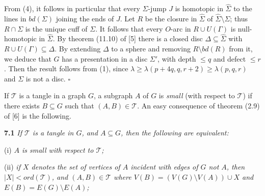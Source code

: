 From (4), it follows in particular that every $\Sigma$-jump $J$ is homotopic in $\hat{\Sigma}$ to the lines in $bd(\Sigma)$ joining the ends of $J$. Let $R$ be the closure in $\hat{\Sigma}$ of $\hat{\Sigma} \setminus \Sigma$; thus $R \cap \Sigma$ is the unique cuff of $\Sigma$. It follows that every $O$-arc in $R \cup U(\Gamma)$ is null-homotopic in $\hat{\Sigma}$. By theorem (11.10) of [5] there is a closed disc $\Delta \subseteq \hat{\Sigma}$ with $R \cup U(\Gamma) \subseteq \Delta$. By extending $\Delta$ to a sphere and removing $R \setminus bd(R)$ from it, we deduce that $G$ has a presentation in a disc $\Sigma'$, with depth $\le q$ and defect $\le r$. Then the result follows from (1), since $\lambda \ge \lambda(p + 4q, q, r + 2) \ge \lambda(p, q, r)$ and $\Sigma$ is not a disc. $\square$


If $\mathcal{T}$ is a tangle in a graph $G$, a subgraph $A$ of $G$ is \textit{small} (with respect to $\mathcal{T}$) if there exists $B \subseteq G$ such that $(A, B) \in \mathcal{T}$. An easy consequence of theorem (2.9) of [6] is the following.

\textbf{7.1} \textit{If $\mathcal{T}$ is a tangle in $G$, and $A \subseteq G$, then the following are equivalent:}

\hspace*{12pt}(i) \textit{$A$ is small with respect to $\mathcal{T}$;}

\hspace*{12pt}(ii) \textit{if $X$ denotes the set of vertices of $A$ incident with edges of $G$ not $A$, then $|X| < ord(\mathcal{T})$, and $(A, B) \in \mathcal{T}$ where $V(B) = (V(G) \setminus V(A)) \cup X$ and $E(B) = E(G) \setminus E(A)$;}
